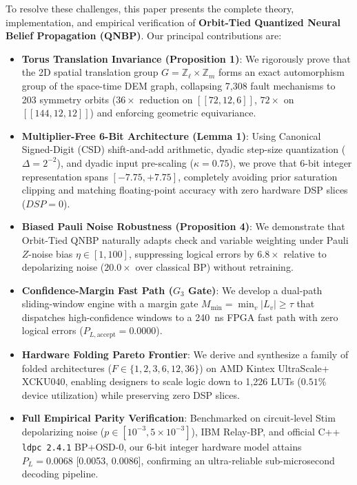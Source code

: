 \documentclass[journal]{IEEEtran}
\begin{document}
To resolve these challenges, this paper presents the complete theory, implementation, and empirical verification of \textbf{Orbit-Tied Quantized Neural Belief Propagation (QNBP)}. Our principal contributions are:
\begin{itemize}
    \item \textbf{Torus Translation Invariance (Proposition 1)}: We rigorously prove that the 2D spatial translation group $G = \mathbb{Z}_\ell \times \mathbb{Z}_m$ forms an exact automorphism group of the space-time DEM graph, collapsing 7,308 fault mechanisms to 203 symmetry orbits ($36\times$ reduction on $[[72,12,6]]$, $72\times$ on $[[144,12,12]]$) and enforcing geometric equivariance.
    \item \textbf{Multiplier-Free 6-Bit Architecture (Lemma 1)}: Using Canonical Signed-Digit (CSD) shift-and-add arithmetic, dyadic step-size quantization ($\Delta = 2^{-2}$), and dyadic input pre-scaling ($\kappa = 0.75$), we prove that 6-bit integer representation spans $[-7.75, +7.75]$, completely avoiding prior saturation clipping and matching floating-point accuracy with zero hardware DSP slices ($DSP=0$).
    \item \textbf{Biased Pauli Noise Robustness (Proposition 4)}: We demonstrate that Orbit-Tied QNBP naturally adapts check and variable weighting under Pauli $Z$-noise bias $\eta \in [1, 100]$, suppressing logical errors by $6.8\times$ relative to depolarizing noise ($20.0\times$ over classical BP) without retraining.
    \item \textbf{Confidence-Margin Fast Path ($G_3$ Gate)}: We develop a dual-path sliding-window engine with a margin gate $M_{\min} = \min_{v} |L_v| \ge \tau$ that dispatches high-confidence windows to a 240~ns FPGA fast path with zero logical errors ($P_{L, \text{accept}} = 0.0000$).
    \item \textbf{Hardware Folding Pareto Frontier}: We derive and synthesize a family of folded architectures ($F \in \{1, 2, 3, 6, 12, 36\}$) on AMD Kintex UltraScale+ XCKU040, enabling designers to scale logic down to 1,226 LUTs ($0.51\%$ device utilization) while preserving zero DSP slices.
    \item \textbf{Full Empirical Parity Verification}: Benchmarked on circuit-level Stim depolarizing noise ($p \in [10^{-3}, 5\times 10^{-3}]$), IBM Relay-BP, and official C++ \texttt{ldpc 2.4.1} BP+OSD-0, our 6-bit integer hardware model attains $P_L = 0.0068$ [0.0053, 0.0086], confirming an ultra-reliable sub-microsecond decoding pipeline.
\end{itemize}
\end{document}
